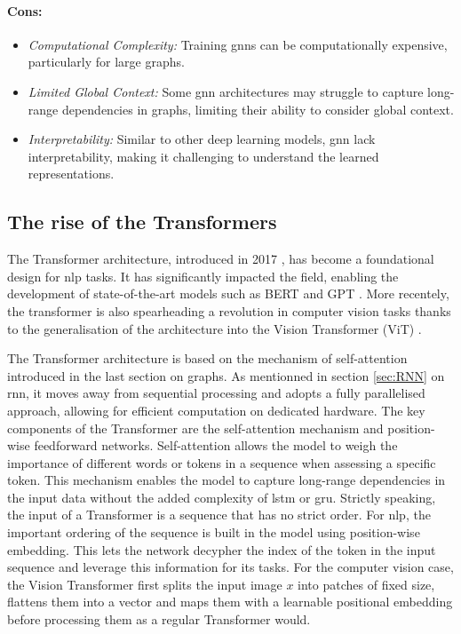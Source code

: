 \paragraph{Cons:}
\begin{itemize}
    \item \textit{Computational Complexity:} Training \gls{gnn}s can be computationally expensive, particularly for large graphs.
    \item \textit{Limited Global Context:} Some \gls{gnn} architectures may struggle to capture long-range dependencies in graphs, limiting their ability to consider global context.
    \item \textit{Interpretability:} Similar to other deep learning models, \gls{gnn} lack interpretability, making it challenging to understand the learned representations.
\end{itemize}

\subsection{The rise of the Transformers}\label{sec:transformer}

The Transformer architecture, introduced in 2017 \cite{NIPS_transformerPaper}, has become a foundational design for \gls{nlp} tasks. It has significantly impacted the field, enabling the development of state-of-the-art models such as BERT \cite{devlin-etal-2019-bert} and GPT \cite{radford2018improving}. More recentely, the transformer is also spearheading a revolution in computer vision tasks thanks to the generalisation of the architecture into the Vision Transformer (ViT) \cite{vitPaper}.

The Transformer architecture is based on the mechanism of self-attention introduced in the last section on graphs. As mentionned in section \ref{sec:RNN} on \gls{rnn}, it moves away from sequential processing and adopts a fully parallelised approach, allowing for efficient computation on dedicated hardware. The key components of the Transformer are the self-attention mechanism and position-wise feedforward networks. Self-attention allows the model to weigh the importance of different words or tokens in a sequence when assessing a specific token. This mechanism enables the model to capture long-range dependencies in the input data without the added complexity of \gls{lstm} or \gls{gru}. Strictly speaking, the input of a Transformer is a sequence that has no strict order. For \gls{nlp}, the important ordering of the sequence is built in the model using position-wise embedding. This lets the network decypher the index of the token in the input sequence and leverage this information for its tasks. For the computer vision case, the Vision Transformer first splits the input image $x$ into patches of fixed size, flattens them into a vector and maps them with a learnable positional embedding before processing them as a regular Transformer would.

